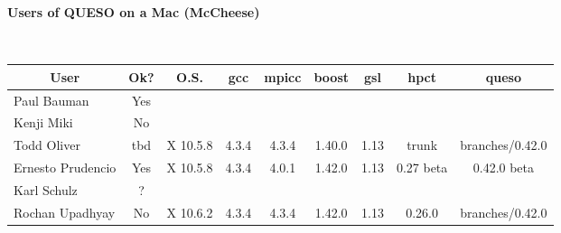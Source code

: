 \documentclass[12pt,letterpaper,twoside,onecolumn,portrait,leqno]{book}
\begin{document}
\setlength{\unitlength}{1.0in}
\setlength{\parindent}{0cm}
\setlength{\parskip}{2ex}
\thispagestyle{empty}

\centerline{\bf Users of QUESO on a Mac (McCheese)}

$~$\\

\begin{table}[!h]
\begin{center}
\begin{tabular}{|l|c|c|c|c|c|c|c|c|}
\hline
\multicolumn{1}{|c|}{User} & Ok? & O.S.     & gcc    & mpicc   & boost  & gsl   & hpct      & queso       \\
\hline
\hline
Paul Bauman                & Yes &          &        &         &        &       &           &             \\
\hline
Kenji Miki                 & No  &          &        &         &        &       &           &             \\
\hline
Todd Oliver                & tbd & X 10.5.8 & 4.3.4  & 4.3.4   & 1.40.0 & 1.13  & trunk     & branches/0.42.0      \\
\hline
Ernesto Prudencio          & Yes & X 10.5.8 & 4.3.4  & 4.0.1   & 1.42.0 & 1.13  & 0.27 beta & 0.42.0 beta \\
\hline
Karl Schulz                & ?   &          &        &         &        &       &           &             \\
\hline
Rochan Upadhyay            & No  & X 10.6.2 & 4.3.4  & 4.3.4   & 1.42.0 & 1.13  & 0.26.0    & branches/0.42.0 \\
\hline
\end{tabular}
\end{center}
\end{table}
\end{document}
